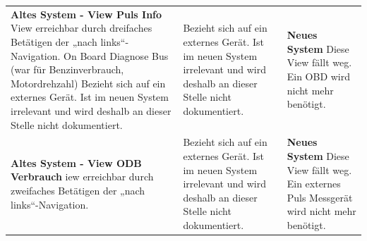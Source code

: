 \begin{longtable}{p{4.5cm} p{3cm} p{4.5cm}}
	\textbf{Altes System -  View Puls Info} \newline  
	View erreichbar durch dreifaches Betätigen der „nach links“-Navigation. \newline
On Board Diagnose Bus (war für Benzinverbrauch, Motordrehzahl)	Bezieht sich auf ein externes Gerät. Ist im neuen System irrelevant und wird deshalb an dieser Stelle nicht dokumentiert. \newline 
	& \newline \newline Bezieht sich auf ein externes Gerät. Ist im neuen System irrelevant und wird deshalb an dieser Stelle nicht dokumentiert.  
	&\textbf{Neues System} \newline \newline 
Diese View fällt weg. Ein OBD wird nicht mehr benötigt.\\
	
	\textbf{Altes System -   View ODB Verbrauch} \newline 
	iew erreichbar durch zweifaches Betätigen der „nach links“-Navigation. 
	& \newline \newline Bezieht sich auf ein externes Gerät. Ist im neuen System irrelevant und wird deshalb an dieser Stelle nicht dokumentiert.
	&\textbf{Neues System} \newline \newline 
Diese View fällt weg. Ein externes Puls Messgerät wird nicht mehr benötigt.\\



\end{longtable}
